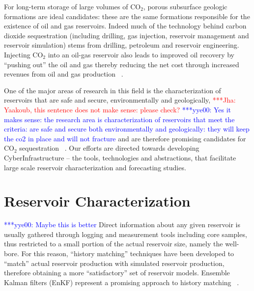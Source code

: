 \documentclass[10pt,conference,final]{IEEEtran}
\newcommand{\jhanote}[1]{ {\textcolor{red} { ***Jha: #1 }}}
\newcommand{\yyenote}[1]{ {\textcolor{blue} { ***yye00: #1 }}}
\newcommand{\jhanote}[1]{}
\newcommand{\yyenote}[1]{}
\begin{document}
For long-term storage of large volumes of CO$_2$, porous subsurface geologic formations are ideal candidates: these are the same formations responsible for the existence of oil and gas reservoirs. Indeed much of the technology behind carbon dioxide sequestration (including drilling, gas injection, reservoir management and reservoir simulation) stems from drilling, petroleum and reservoir engineering. Injecting CO$_2$ into an oil-gas reservoir also leads to improved oil recovery by ``pushing out'' the oil and gas thereby reducing the net cost through increased revenues from oil and gas production ~\cite{EORBook}.

One of the major areas of research in this field is the characterization of reservoirs that are safe and secure, environmentally and geologically, \jhanote{Yaakoub, this sentence does not make sense: please check?} \yyenote{Yes it makes sense: the research area is characterization of reservoirs that meet the criteria: are safe and secure both environmentally and geologically: they will keep the co2 in place and will not fracture}  and are therefore promising candidates for CO$_2$ sequestration ~\cite{GeoRPT,Luigi}. Our efforts are directed towards developing CyberInfrastructure -- the tools, technologies and abstractions, that facilitate large scale reservoir characterization and forecasting studies.

\section*{Reservoir Characterization}
\yyenote{Maybe this is better} Direct information about any given reservoir is usually gathered through logging and measurement tools including core samples, thus restricted to a small portion of the actual reservoir size, namely the well-bore. For this reason, ``history matching'' techniques have been developed to ``match'' actual reservoir production with simulated reservoir production, therefore obtaining a more ``satisfactory'' set of reservoir models.  Ensemble Kalman filters (EnKF) represent a promising approach to history matching ~\cite{KalmanPaper, DO2007, LiEnKF07, DO2006}.



\end{document}
